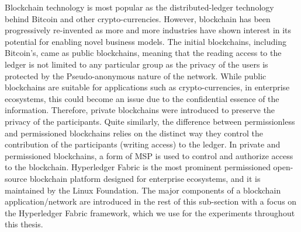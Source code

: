Blockchain technology is most popular as the distributed-ledger technology behind Bitcoin and other crypto-currencies. However, blockchain has been progressively re-invented as more and more industries have shown interest in its potential for enabling novel business models. The initial blockchains, including Bitcoin's, came as public blockchains, meaning that the reading access to the ledger is not limited to any particular group as the privacy of the users is protected by the Pseudo-anonymous nature of the network. While public blockchains are suitable for applications such as crypto-currencies, in enterprise ecosystems, this could become an issue due to the confidential essence of the information. Therefore, private blockchains were introduced to preserve the privacy of the participants. Quite similarly, the difference between permissionless and permissioned blockchains relies on the distinct way they control the contribution of the participants (writing access) to the ledger. In private and permissioned blockchains, a form of \ac{MSP} is used to control and authorize access to the blockchain. Hyperledger Fabric \cite{fabric} is the most prominent permissioned open-source blockchain platform designed for enterprise ecosystems, and it is maintained by the Linux Foundation.
The major components of a blockchain application/network are introduced in the rest of this sub-section with a focus on the Hyperledger Fabric framework, which we use for the experiments throughout this thesis. 





